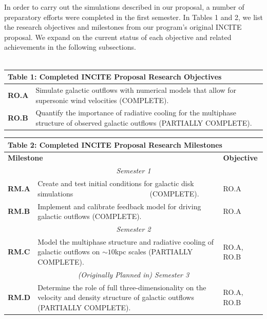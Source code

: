 \documentclass[11pt,letterpaper,english]{article}
\begin{document}
In order to carry out the simulations described in our proposal, a number of preparatory efforts were completed in the first semester. In Tables 1 and 2, we list the research objectives and milestones from our program's original INCITE proposal. We expand on the current status of each objective and related achievements in the following subsections.
~\\~\\
\begin{table}[h]
\vspace{-.12in}
\begin{tabular}{|l|p{5.6in}|} 
\multicolumn{2}{l}{\bf{Table 1: Completed INCITE Proposal Research Objectives}}\\
\hline
\textbf{RO.A} & Simulate galactic outflows with numerical models that allow for supersonic
wind velocities (COMPLETE). \\ \hline
\textbf{RO.B} & Quantify the importance of radiative cooling 
for the multiphase structure of observed galactic outflows (PARTIALLY COMPLETE).\\ \hline
\hline
\end{tabular}
\end{table}


\begin{table}[h]
\vspace{-.12in}
\begin{tabular}{|l|p{4.6in}|l|} 
\multicolumn{3}{l}{\bf{Table 2: Completed INCITE Proposal Research Milestones}}\\
\hline
\multicolumn{2}{|l|}{\bf Milestone} & {\bf Objective} \\ \hline
\multicolumn{3}{|c|}{\it Semester 1} \\ \hline
\textbf{RM.A} & Create and test initial conditions for galactic disk simulations ~~~~~~~~~~~~~~~~~~~~ (COMPLETE). & RO.A \\ \hline
\textbf{RM.B} & Implement and calibrate feedback model for driving galactic outflows (COMPLETE). & RO.A\\ \hline
\multicolumn{3}{|c|}{\it Semester 2} \\ \hline
\textbf{RM.C} & Model the multiphase structure and radiative cooling of galactic
outflows on $\sim10$kpc scales (PARTIALLY COMPLETE). & RO.A, RO.B \\ \hline
\multicolumn{3}{|c|}{\it (Originally Planned in) Semester 3} \\ \hline
\textbf{RM.D} & Determine the role of full three-dimensionality on the velocity and density
structure of galactic outflows (PARTIALLY COMPLETE). & RO.A, RO.B\\ \hline
\hline
\end{tabular}
\end{table}
\end{document}
